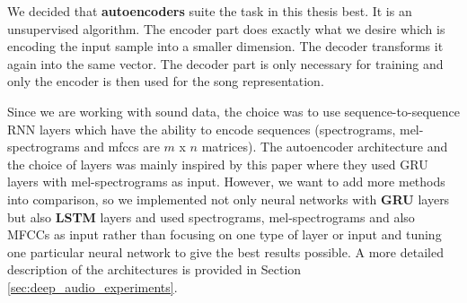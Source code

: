 We decided that \textbf{autoencoders} suite the task in this thesis best. It is an unsupervised algorithm. The encoder part does exactly what we desire which is encoding the input sample into a smaller dimension. The decoder transforms it again into the same vector. The decoder part is only necessary for training and only the encoder is then used for the song representation.

Since we are working with sound data, the choice was to use sequence-to-sequence RNN layers which have the ability to encode sequences (spectrograms, mel-spectrograms and mfccs are $m$ x $n$ matrices). The autoencoder architecture and the choice of layers was mainly inspired by this paper \cite{inproceedings_RNNs} where they used GRU layers with mel-spectrograms as input. However, we want to add more methods into comparison, so we implemented not only neural networks with \textbf{GRU} layers but also \textbf{LSTM} layers and used spectrograms, mel-spectrograms and also MFCCs as input rather than focusing on one type of layer or input and tuning one particular neural network to give the best results possible. A more detailed description of the architectures is provided in Section \ref{sec:deep_audio_experiments}.
